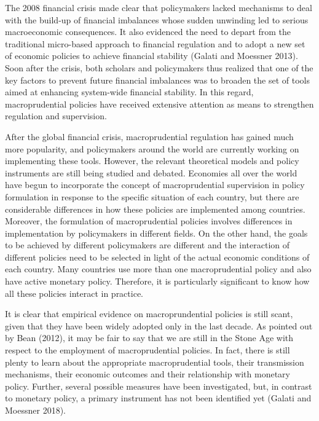 \documentclass[final,3p,times,twocolumn]{elsarticle}
\begin{document}

The 2008 financial crisis made clear that policymakers lacked mechanisms to deal with the build-up of financial imbalances whose sudden unwinding led to serious macroeconomic consequences. It also evidenced the need to depart from the traditional micro-based approach to financial regulation and to adopt a new set of economic policies to achieve financial stability (Galati and Moessner 2013). Soon after the crisis, both scholars and policymakers thus realized that one of the key factors to prevent future financial imbalances was to broaden the set of tools aimed at enhancing system-wide financial stability. In this regard, macroprudential policies have received extensive attention as means to strengthen regulation and supervision.\par


After the global financial crisis, macroprudential regulation has gained much more popularity, and policymakers around the world are currently working on implementing these tools. However, the relevant theoretical models and policy instruments are still being studied and debated. Economies all over the world have begun to incorporate the concept of macroprudential supervision in policy formulation in response to the specific situation of each country, but there are considerable differences in how these policies are implemented among countries. Moreover, the formulation of macroprudential policies involves differences in implementation by policymakers in different fields. On the other hand, the goals to be achieved by different policymakers are different and the interaction of different policies need to be selected in light of the actual economic conditions of each country. Many countries use more than one macroprudential policy and also have active monetary policy. Therefore, it is particularly significant to know how all these policies interact in practice.\par


It is clear that empirical evidence on macroprundential policies is still scant, given that they have been widely adopted only in the last decade. As pointed out by Bean (2012), it may be fair to say that we are still in the Stone Age with respect to the employment of macroprudential policies. In fact, there is still plenty to learn about the appropriate macroprudential tools, their transmission mechanisms, their economic outcomes and their relationship with monetary policy. Further, several possible measures have been investigated, but, in contrast to monetary policy, a primary instrument has not been identified yet (Galati and Moessner 2018).\par
\end{document}
